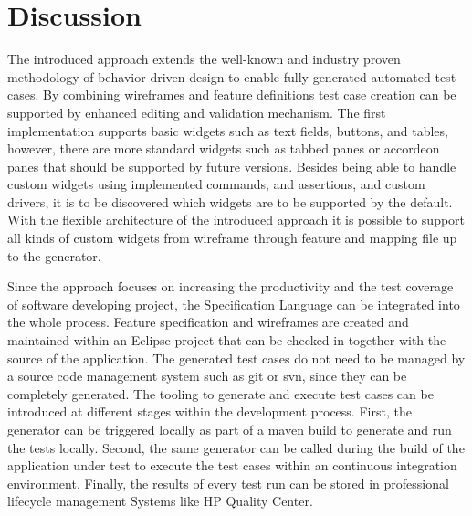 \documentclass{sig-alternate-05-2015}
\begin{document}
\section{Discussion}\label{sec:Discussion}
The introduced approach extends the well-known and industry proven methodology of behavior-driven design to enable fully generated automated test cases.
By combining wireframes and feature definitions test case creation can be supported by enhanced editing and validation mechanism.
The first implementation supports basic widgets such as text fields, buttons, and tables, however, there are more standard widgets such as tabbed panes or accordeon panes that should be supported by future versions.
Besides being able to handle custom widgets using implemented commands, and assertions, and custom drivers, it is to be discovered which widgets are to be supported by the default.
With the flexible architecture of the introduced approach it is possible to support all kinds of custom widgets from wireframe through feature and mapping file up to the generator.

Since the approach focuses on increasing the productivity and the test coverage of software developing project, the Specification Language can be integrated into the whole process.
Feature specification and wireframes are created and maintained within an Eclipse project that can be checked in together with the source of the application.
The generated test cases do not need to be managed by a source code management system such as git or svn, since they can be completely generated.
The tooling to generate and execute test cases can be introduced at different stages within the development process. 
First, the generator can be triggered locally as part of a maven build to generate and run the tests locally.
Second, the same generator can be called during the build of the application under test to execute the test cases within an continuous integration environment.
Finally, the results of every test run can be stored in professional lifecycle management Systems like HP Quality Center.
\end{document}
